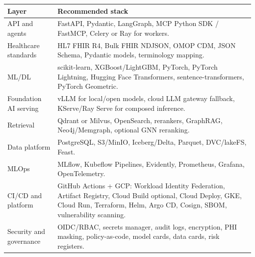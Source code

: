 \begin{tabularx}{\textwidth}{p{}X}
\toprule
\textbf{Layer} & \textbf{Recommended stack} \\
\midrule
API and agents & FastAPI, Pydantic, LangGraph, MCP Python SDK / FastMCP, Celery or Ray for workers. \\
Healthcare standards & HL7 FHIR R4, Bulk FHIR NDJSON, OMOP CDM, JSON Schema, Pydantic models, terminology mapping. \\
ML/DL & scikit-learn, XGBoost/LightGBM, PyTorch, PyTorch Lightning, Hugging Face Transformers, sentence-transformers, PyTorch Geometric. \\
Foundation AI serving & vLLM for local/open models, cloud LLM gateway fallback, KServe/Ray Serve for composed inference. \\
Retrieval & Qdrant or Milvus, OpenSearch, rerankers, GraphRAG, Neo4j/Memgraph, optional GNN reranking. \\
Data platform & PostgreSQL, S3/MinIO, Iceberg/Delta, Parquet, DVC/lakeFS, Feast. \\
MLOps & MLflow, Kubeflow Pipelines, Evidently, Prometheus, Grafana, OpenTelemetry. \\
CI/CD and platform & GitHub Actions + GCP: Workload Identity Federation, Artifact Registry, Cloud Build optional, Cloud Deploy, GKE, Cloud Run, Terraform, Helm, Argo CD, Cosign, SBOM, vulnerability scanning. \\
Security and governance & OIDC/RBAC, secrets manager, audit logs, encryption, PHI masking, policy-as-code, model cards, data cards, risk registers. \\
\bottomrule
\end{tabularx}
